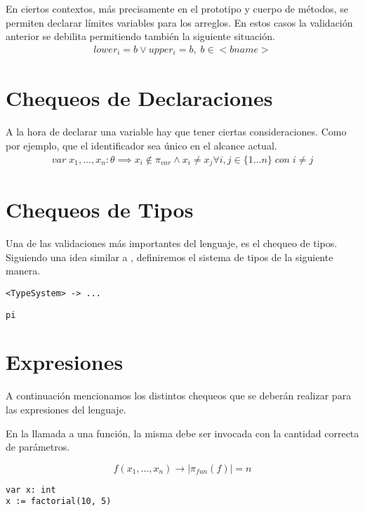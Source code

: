 \documentclass{article}
\begin{document}
En ciertos contextos, más precisamente en el prototipo y cuerpo de métodos, se permiten declarar límites variables para los arreglos.
En estos casos la validación anterior se debilita permitiendo también la siguiente situación.
\begin{gather*}
lower_i = b \vee upper_i = b, \; b \in < \! bname \! >
\end{gather*}

\section{Chequeos de Declaraciones}

A la hora de declarar una variable hay que tener ciertas consideraciones.
Como por ejemplo, que el identificador sea único en el alcance actual.
\begin{gather*}
var \; x_1, ..., x_n : \theta
\implies
x_i \notin \pi_{var}
\wedge
x_i \neq x_j \forall i, j \in \{ 1...n \}
\; con \; i \neq j
\end{gather*}

\section{Chequeos de Tipos}

Una de las validaciones más importantes del lenguaje, es el chequeo de tipos.
Siguiendo una idea similar a \Lib, definiremos el sistema de tipos de la siguiente manera.

\begin{lstlisting}[style = my_syntax]
<TypeSystem> -> ... 
\end{lstlisting}

\begin{lstlisting}[style = my_syntax]
pi
\end{lstlisting}

\section{Expresiones}

A continuación mencionamos los distintos chequeos que se deberán realizar para las expresiones del lenguaje.

En la llamada a una función, la misma debe ser invocada con la cantidad correcta de parámetros.

\[ f(x_1, ..., x_n) \rightarrow |\pi_{fun}(f)| = n \]

\begin{lstlisting}[style = my_lang]
var x: int
x := factorial(10, 5)
\end{lstlisting}
\end{document}
